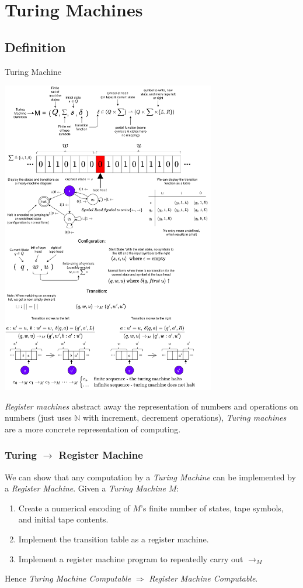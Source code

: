\chapter{Turing Machines}

\section{Definition}
\begin{definitionbox}{Turing Machine}
    \begin{center}
        \includegraphics[width=0.7\textwidth]{turing_machines/images/turing_machine.drawio.png}
    \end{center}
\end{definitionbox}
\noindent
\textit{Register machines} abstract away the representation of numbers and operations on numbers (just uses $\mathbb{N}$ with increment, decrement operations), \textit{Turing machines} are a more concrete representation of computing.

\subsection{Turing $\to$ Register Machine}
We can show that any computation by a \textit{Turing Machine} can be implemented by a \textit{Register Machine}. Given a \textit{Turing Machine} $M$:
\begin{enumerate}
	\item Create a numerical encoding of $M$'s finite number of states, tape symbols, and initial tape contents.
	\item Implement the transition table as a register machine.
	\item Implement a register machine program to repeatedly carry out $\to_M$
\end{enumerate}
Hence \textit{Turing Machine Computable} $\Rightarrow$ \textit{Register Machine Computable}.

